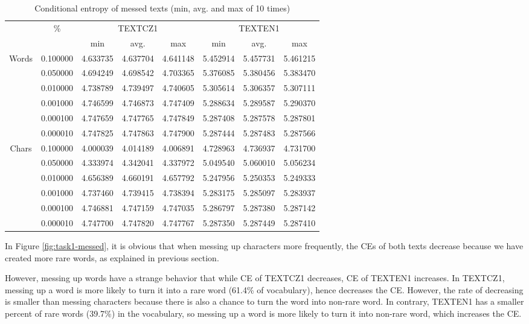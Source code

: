 \documentclass{article}
\begin{document}
\begin{table}[h]
    \centering
    \begin{tabular}{|c|c|c|c|c|c|c|c|} 
        \hline
        \multirow{2}{1em}{} & \multirow{2}{1em}{\%} & \multicolumn{3}{|c|}{TEXTCZ1} & \multicolumn{3}{|c|}{TEXTEN1} \\
        \cline{3-8}
        & & min & avg. & max & min & avg. & max \\
        \hline
        \multirow{6}{3em}{Words} & 0.100000 & 4.633735 & 4.637704 & 4.641148 & 5.452914 & 5.457731 & 5.461215 \\
        & 0.050000 & 4.694249 & 4.698542 & 4.703365 & 5.376085 & 5.380456 & 5.383470 \\
        & 0.010000 & 4.738789 & 4.739497 & 4.740605 & 5.305614 & 5.306357 & 5.307111 \\
        & 0.001000 & 4.746599 & 4.746873 & 4.747409 & 5.288634 & 5.289587 & 5.290370 \\
        & 0.000100 & 4.747659 & 4.747765 & 4.747849 & 5.287408 & 5.287578 & 5.287801 \\
        & 0.000010 & 4.747825 & 4.747863 & 4.747900 & 5.287444 & 5.287483 & 5.287566 \\
        \hline
        \multirow{6}{3em}{Chars} & 0.100000 & 4.000039 & 4.014189 & 4.006891 & 4.728963 & 4.736937 & 4.731700 \\
        & 0.050000 & 4.333974 & 4.342041 & 4.337972 & 5.049540 & 5.060010 & 5.056234 \\
        & 0.010000 & 4.656389 & 4.660191 & 4.657792 & 5.247956 & 5.250353 & 5.249333 \\
        & 0.001000 & 4.737460 & 4.739415 & 4.738394 & 5.283175 & 5.285097 & 5.283937 \\
        & 0.000100 & 4.746881 & 4.747159 & 4.747035 & 5.286797 & 5.287380 & 5.287142 \\
        & 0.000010 & 4.747700 & 4.747820 & 4.747767 & 5.287350 & 5.287449 & 5.287410 \\
        \hline
    \end{tabular}
    \caption{Conditional entropy of messed texts (min, avg. and max of 10 times)}
    \label{table:task1-messed}
\end{table}

In Figure \ref{fig:task1-messed}, it is obvious that when messing up characters more frequently, the CEs of both texts decrease because we have created more rare words, as explained in previous section.

However, messing up words have a strange behavior that while CE of TEXTCZ1 decreases, CE of TEXTEN1 increases. In TEXTCZ1, messing up a word is more likely to turn it into a rare word (61.4\% of vocabulary), hence decreases the CE. However, the rate of decreasing is smaller than messing characters because there is also a chance to turn the word into non-rare word. In contrary, TEXTEN1 has a smaller percent of rare words (39.7\%) in the vocabulary, so messing up a word is more likely to turn it into non-rare word, which increases the CE.
\end{document}
